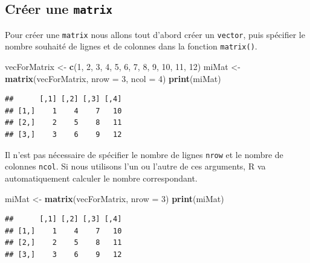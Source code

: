 \documentclass[]{book}
\newenvironment{Shaded}{\begin{snugshade}}{\end{snugshade}}
\newcommand{\DataTypeTok}[1]{\textcolor[rgb]{0.13,0.29,0.53}{#1}}
\newcommand{\DecValTok}[1]{\textcolor[rgb]{0.00,0.00,0.81}{#1}}
\newcommand{\KeywordTok}[1]{\textcolor[rgb]{0.13,0.29,0.53}{\textbf{#1}}}
\newcommand{\NormalTok}[1]{#1}
\newcommand{\StringTok}[1]{\textcolor[rgb]{0.31,0.60,0.02}{#1}}
\begin{document}
\hypertarget{creer-une-matrix}{%
\subsection{\texorpdfstring{Créer une \texttt{matrix}}{Créer une matrix}}\label{creer-une-matrix}}

Pour créer une \texttt{matrix} nous allons tout d'abord créer un \texttt{vector}, puis spécifier le nombre souhaité de lignes et de colonnes dans la fonction \texttt{matrix()}.

\begin{Shaded}
\begin{Highlighting}[]
\NormalTok{vecForMatrix <-}\StringTok{ }\KeywordTok{c}\NormalTok{(}\DecValTok{1}\NormalTok{, }\DecValTok{2}\NormalTok{, }\DecValTok{3}\NormalTok{, }\DecValTok{4}\NormalTok{, }\DecValTok{5}\NormalTok{, }\DecValTok{6}\NormalTok{, }\DecValTok{7}\NormalTok{, }\DecValTok{8}\NormalTok{, }\DecValTok{9}\NormalTok{, }\DecValTok{10}\NormalTok{, }\DecValTok{11}\NormalTok{, }\DecValTok{12}\NormalTok{)}
\NormalTok{miMat <-}\StringTok{ }\KeywordTok{matrix}\NormalTok{(vecForMatrix, }\DataTypeTok{nrow =} \DecValTok{3}\NormalTok{, }\DataTypeTok{ncol =} \DecValTok{4}\NormalTok{)}
\KeywordTok{print}\NormalTok{(miMat)}
\end{Highlighting}
\end{Shaded}

\begin{verbatim}
##      [,1] [,2] [,3] [,4]
## [1,]    1    4    7   10
## [2,]    2    5    8   11
## [3,]    3    6    9   12
\end{verbatim}

Il n'est pas nécessaire de spécifier le nombre de lignes \texttt{nrow} et le nombre de colonnes \texttt{ncol}. Si nous utilisons l'un ou l'autre de ces arguments, R va automatiquement calculer le nombre correspondant.

\begin{Shaded}
\begin{Highlighting}[]
\NormalTok{miMat <-}\StringTok{ }\KeywordTok{matrix}\NormalTok{(vecForMatrix, }\DataTypeTok{nrow =} \DecValTok{3}\NormalTok{)}
\KeywordTok{print}\NormalTok{(miMat)}
\end{Highlighting}
\end{Shaded}

\begin{verbatim}
##      [,1] [,2] [,3] [,4]
## [1,]    1    4    7   10
## [2,]    2    5    8   11
## [3,]    3    6    9   12
\end{verbatim}
\end{document}
